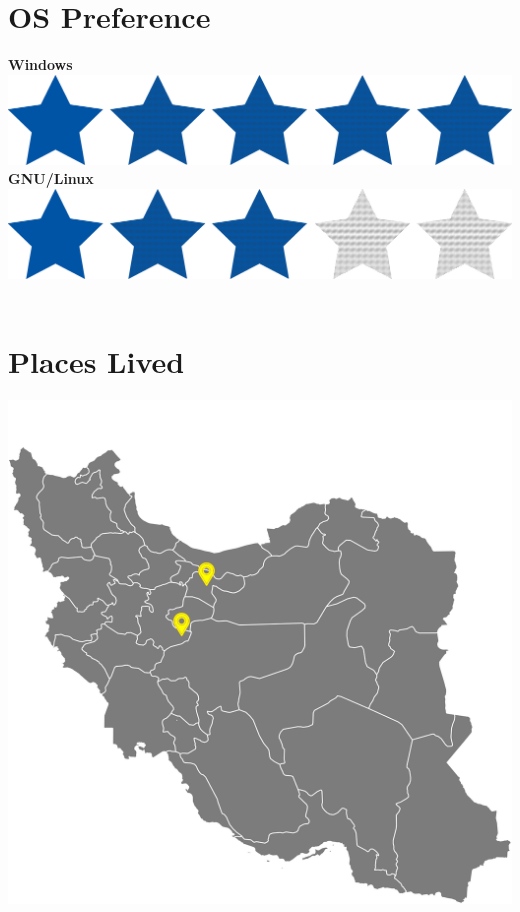 \documentclass[a4paper]{friggeri-cv}
\begin{document}
\begin{aside}
        \section{OS Preference}\label{sec:os-preference}
        \textbf{Windows}\includegraphics[scale=0.33]{../assets/images/stars/5stars.png}
        \textbf{GNU/Linux}\includegraphics[scale=0.33]{../assets/images/stars/3stars.png}
        ~
        \section{Places Lived}\label{sec:places-lived}
        \includegraphics[scale=0.5]{../assets/images/iran.png}
        ~
    \end{aside}
    ~
\end{document}
